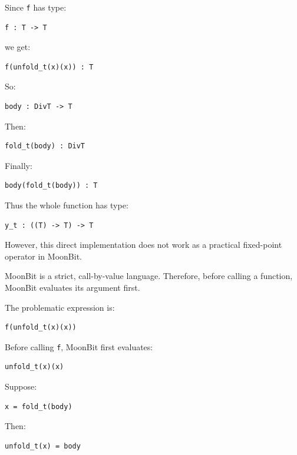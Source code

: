 \documentclass[manuscript]{acmart}
\begin{document}
Since \texttt{f} has type:

\begin{lstlisting}
f : T -> T
\end{lstlisting}

we get:

\begin{lstlisting}
f(unfold_t(x)(x)) : T
\end{lstlisting}

So:

\begin{lstlisting}
body : DivT -> T
\end{lstlisting}

Then:

\begin{lstlisting}
fold_t(body) : DivT
\end{lstlisting}

Finally:

\begin{lstlisting}
body(fold_t(body)) : T
\end{lstlisting}

Thus the whole function has type:

\begin{lstlisting}
y_t : ((T) -> T) -> T
\end{lstlisting}

However, this direct implementation does not work as a practical fixed-point operator in MoonBit.

MoonBit is a strict, call-by-value language. Therefore, before calling a function, MoonBit evaluates its argument first.

The problematic expression is:

\begin{lstlisting}
f(unfold_t(x)(x))
\end{lstlisting}

Before calling \texttt{f}, MoonBit first evaluates:

\begin{lstlisting}
unfold_t(x)(x)
\end{lstlisting}

Suppose:

\begin{lstlisting}
x = fold_t(body)
\end{lstlisting}

Then:

\begin{lstlisting}
unfold_t(x) = body
\end{lstlisting}
\end{document}
